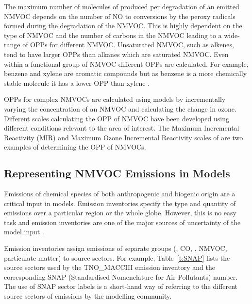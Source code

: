 The maximum number of molecules of  produced per degradation of an emitted NMVOC depends on the number of NO to  conversions by the peroxy radicals formed during the degradation of the NMVOC.
This is highly dependent on the type of NMVOC and the number of carbons in the NMVOC leading to a wide-range of OPPs for different NMVOC.
Unsaturated NMVOC, such as alkenes, tend to have larger OPPs than alkanes which are saturated NMVOC.
Even within a functional group of NMVOC different OPPs are calculated.
For example, benzene and xylene are aromatic compounds but as benzene is a more chemically stable molecule it has a lower OPP than xylene \citep{Carter:1994}.

OPPs for complex NMVOCs are calculated using models by incrementally varying the concentration of an NMVOC and calculating the change in ozone.
Different scales calculating the OPP of NMVOC have been developed using different  conditions relevant to the area of interest.
The Maximum Incremental Reactivity (MIR) and Maximum Ozone Incremental Reactivity scales of \citet{Carter:1994} are two examples of determining the OPP of NMVOCs.

\subsection{Representing NMVOC Emissions in Models}
Emissions of chemical species of both anthropogenic and biogenic origin are a critical input in models.
Emission inventories specify the type and quantity of emissions over a particular region or the whole globe.
However, this is no easy task and emission inventories are one of the major sources of uncertainty of the model input \citep{Russell:2000}.

Emission inventories assign emissions of separate groups (, CO, , NMVOC, particulate matter) to source sectors. 
For example, Table~\ref{t:SNAP} lists the source sectors used by the TNO\_MACCIII emission inventory and the corresponding SNAP (Standardised Nomenclature for Air Pollutants) number.
The use of SNAP sector labels is a short-hand way of referring to the different source sectors of emissions by the modelling community. 


